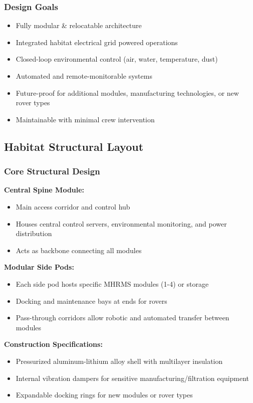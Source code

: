 \documentclass[12pt, a4paper]{article}
\begin{document}
\subsubsection{Design Goals}
\begin{itemize}
    \item Fully modular \& relocatable architecture
    \item Integrated habitat electrical grid powered operations
    \item Closed-loop environmental control (air, water, temperature, dust)
    \item Automated and remote-monitorable systems
    \item Future-proof for additional modules, manufacturing technologies, or new rover types
    \item Maintainable with minimal crew intervention
\end{itemize}

\subsection{Habitat Structural Layout}

\subsubsection{Core Structural Design}

\textbf{Central Spine Module:}
\begin{itemize}
    \item Main access corridor and control hub
    \item Houses central control servers, environmental monitoring, and power distribution
    \item Acts as backbone connecting all modules
\end{itemize}

\textbf{Modular Side Pods:}
\begin{itemize}
    \item Each side pod hosts specific MHRMS modules (1-4) or storage
    \item Docking and maintenance bays at ends for rovers
    \item Pass-through corridors allow robotic and automated transfer between modules
\end{itemize}

\textbf{Construction Specifications:}
\begin{itemize}
    \item Pressurized aluminum-lithium alloy shell with multilayer insulation
    \item Internal vibration dampers for sensitive manufacturing/filtration equipment
    \item Expandable docking rings for new modules or rover types
\end{itemize}
\end{document}
